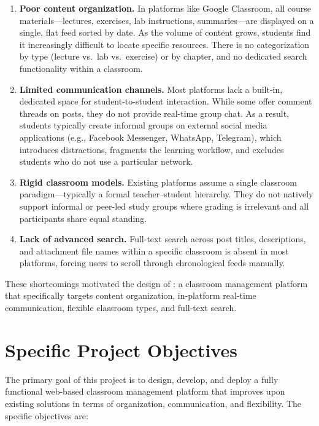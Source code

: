\begin{enumerate}[label=(\roman*)]
  \item \textbf{Poor content organization.}
        In platforms like Google Classroom, all course materials---lectures, exercises, lab instructions, summaries---are displayed on a single, flat feed sorted by date.
        As the volume of content grows, students find it increasingly difficult to locate specific resources.
        There is no categorization by type (lecture vs.\ lab vs.\ exercise) or by chapter, and no dedicated search functionality within a classroom.

  \item \textbf{Limited communication channels.}
        Most platforms lack a built-in, dedicated space for student-to-student interaction.
        While some offer comment threads on posts, they do not provide real-time group chat.
        As a result, students typically create informal groups on external social media applications (e.g., Facebook Messenger, WhatsApp, Telegram), which introduces distractions, fragments the learning workflow, and excludes students who do not use a particular network.

  \item \textbf{Rigid classroom models.}
        Existing platforms assume a single classroom paradigm---typically a formal teacher--student hierarchy.
        They do not natively support informal or peer-led study groups where grading is irrelevant and all participants share equal standing.

  \item \textbf{Lack of advanced search.}
        Full-text search across post titles, descriptions, and attachment file names within a specific classroom is absent in most platforms, forcing users to scroll through chronological feeds manually.
\end{enumerate}

These shortcomings motivated the design of \eduspace{}: a classroom management platform that specifically targets content organization, in-platform real-time communication, flexible classroom types, and full-text search.

\section{Specific Project Objectives}
\label{sec:objectives}

The primary goal of this project is to design, develop, and deploy a fully functional web-based classroom management platform that improves upon existing solutions in terms of organization, communication, and flexibility.
The specific objectives are:

